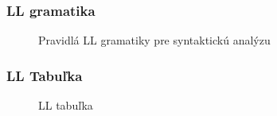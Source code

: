 \documentclass[a4paper, 11pt]{article}
\begin{document}
    \subsubsection{LL gramatika}
    \begin{figure}[h]
		\centering
		\caption{Pravidlá LL gramatiky pre syntaktickú analýzu}
	\end{figure}
	\pagebreak
    \subsubsection{LL Tabuľka}
    \begin{figure}[h]
		\centering
	    \caption{LL tabuľka}
	\end{figure}
\end{document}
